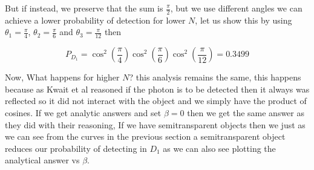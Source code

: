\documentclass[12pt]{book}
\begin{document}
But if instead, we preserve that the sum is $\frac{\pi}{2}$,  but we use different angles we can achieve a lower probability of detection for lower $N$, let us show this by using $\theta_{1}=\frac{\pi}{4}$, $\theta_{2}=\frac{\pi}{6}$ and $\theta_{3}=\frac{\pi}{12}$ then 

\begin{equation}
P_{D_{1}}=\cos^{2}{\left(\frac{\pi}{4} \right)} \cos^{2}{\left(\frac{\pi}{6} \right)} \cos^{2}{\left(\frac{\pi}{12} \right)}=0.3499
\end{equation}

Now, What happens for higher $N$? this analysis remains the same, this happens because as Kwait et al \cite{exp} reasoned if the photon is to be detected then it always was reflected so it did not interact with the object and we simply have the product of cosines. If we get analytic answers and set $\beta=0$ then we get the same answer as they did with their reasoning, If we have semitransparent objects then we just as we can see from the curves in the previous section a semitransparent object reduces our probability of detecting in $D_{1}$ as we can also see plotting the analytical answer vs $\beta$.
\end{document}
